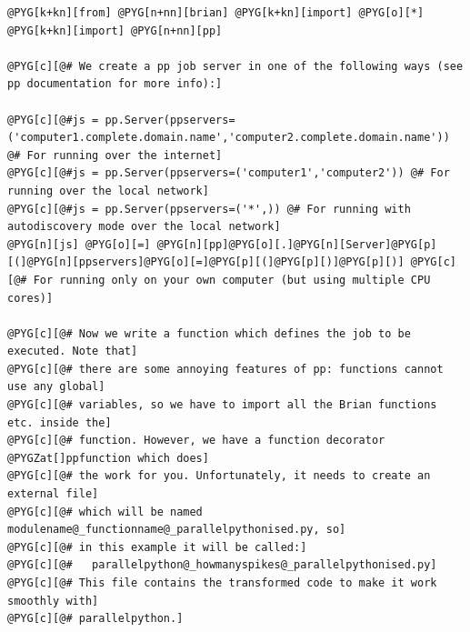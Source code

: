 \documentclass[letterpaper,10pt,english]{manual}
\begin{document}
\begin{Verbatim}[commandchars=@\[\]]
@PYG[k+kn][from] @PYG[n+nn][brian] @PYG[k+kn][import] @PYG[o][*]
@PYG[k+kn][import] @PYG[n+nn][pp]

@PYG[c][@# We create a pp job server in one of the following ways (see pp documentation for more info):]

@PYG[c][@#js = pp.Server(ppservers=('computer1.complete.domain.name','computer2.complete.domain.name')) @# For running over the internet]
@PYG[c][@#js = pp.Server(ppservers=('computer1','computer2')) @# For running over the local network]
@PYG[c][@#js = pp.Server(ppservers=('*',)) @# For running with autodiscovery mode over the local network]
@PYG[n][js] @PYG[o][=] @PYG[n][pp]@PYG[o][.]@PYG[n][Server]@PYG[p][(]@PYG[n][ppservers]@PYG[o][=]@PYG[p][(]@PYG[p][)]@PYG[p][)] @PYG[c][@# For running only on your own computer (but using multiple CPU cores)]

@PYG[c][@# Now we write a function which defines the job to be executed. Note that]
@PYG[c][@# there are some annoying features of pp: functions cannot use any global]
@PYG[c][@# variables, so we have to import all the Brian functions etc. inside the]
@PYG[c][@# function. However, we have a function decorator @PYGZat[]ppfunction which does]
@PYG[c][@# the work for you. Unfortunately, it needs to create an external file]
@PYG[c][@# which will be named modulename@_functionname@_parallelpythonised.py, so]
@PYG[c][@# in this example it will be called:]
@PYG[c][@#   parallelpython@_howmanyspikes@_parallelpythonised.py]
@PYG[c][@# This file contains the transformed code to make it work smoothly with]
@PYG[c][@# parallelpython.]


\end{Verbatim}
\end{document}
